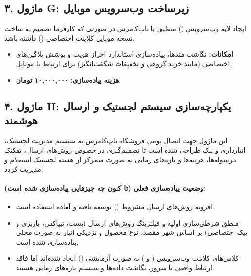 \documentclass[11pt,a4paper]{article}
\begin{document}
\subsection{۳. ماژول G: زیرساخت وب‌سرویس موبایل }
ایجاد لایه وب‌سرویس () منطبق با ناپ‌کامرس در صورتی که کارفرما تصمیم به ساخت نسخه موبایل کلاینت اختصاصی () داشته باشد.
\begin{itemize}
    \item \textbf{امکانات:} نگاشت متدها، پیاده‌سازی استاندارد احراز هویت  و پوشش پلاگین‌های اختصاصی (مانند خرید گروهی و تخفیفات شگفت‌انگیز) برای ارتباط با موبایل.
    \item \textbf{هزینه پیاده‌سازی:} \textbf{۱۰,۰۰۰,۰۰۰ تومان}.
\end{itemize}

\subsection{۴. ماژول H: یکپارچه‌سازی سیستم لجستیک و ارسال هوشمند}
این ماژول جهت اتصال بومی فروشگاه ناپ‌کامرس به سیستم مدیریت لجستیک، انبارداری و پیک طراحی شده است تا تصمیم‌گیری در خصوص روش‌های ارسال، تفکیک مرسوله‌ها، هزینه‌ها و بازه‌های زمانی به صورت متمرکز از هسته لجستیک استعلام و مدیریت گردد.

\paragraph{وضعیت پیاده‌سازی فعلی (تا کنون چه چیزهایی پیاده‌سازی شده است):}
\begin{itemize}
    \item افزونه روش‌های ارسال مشروط () توسعه یافته و آماده استفاده است.
    \item منطق شرطی‌سازی اولیه و فیلترینگ روش‌های ارسال (پست، تیپاکس، باربری و پیک اختصاصی) بر اساس شهر مقصد، نوع محصول و نزدیکی انبار به صورت محلی پیاده‌سازی شده است.
    \item کلاس‌های کلاینت وب‌سرویس ( و ) به صورت آزمایشی () ایجاد شده‌اند اما فاقد ارتباط واقعی با سرور، نگاشت داده‌ها و سیستم بازه‌های زمانی هستند.
\end{itemize}
\end{document}
